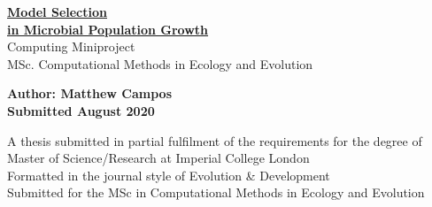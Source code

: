 \begin{titlepage}
    \begin{center}
    \vspace*{1cm}

    \Huge
    \textbf{\underline{Model Selection}}\\
    \textbf{\underline{in Microbial Population Growth}}\\

    \vspace*{0.5cm}
    \LARGE
    Computing Miniproject\\
    MSc. Computational Methods in Ecology and Evolution\\

    \vspace*{1.5cm}

    \large
    \textbf{Author: Matthew Campos}\\
    \textbf{Submitted August 2020}

    \vspace*{0.8cm}

    \normalsize
    A thesis submitted in partial fulfilment of the requirements for the degree of Master of Science/Research at Imperial College London\\
    Formatted in the journal style of Evolution \& Development\\
    Submitted for the MSc in Computational Methods in Ecology and Evolution\\

    \vspace*{0.8cm}

    \end{center}
\end{titlepage}

